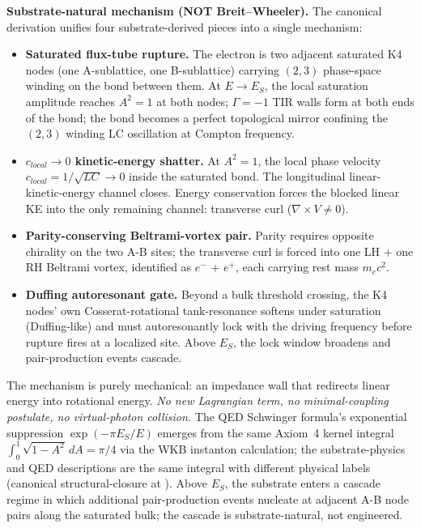 \textbf{Substrate-natural mechanism (NOT Breit--Wheeler).} The canonical derivation unifies four substrate-derived pieces into a single mechanism:

\begin{itemize}
    \item \textbf{Saturated flux-tube rupture.} The electron is two adjacent saturated K4 nodes (one A-sublattice, one B-sublattice) carrying $(2,3)$ phase-space winding on the bond between them. At $E \to E_S$, the local saturation amplitude reaches $A^2 = 1$ at both nodes; $\Gamma = -1$\gammaundeclared{} TIR walls form at both ends of the bond; the bond becomes a perfect topological mirror confining the $(2,3)$ winding LC oscillation at Compton frequency.
    \item \textbf{$c_{local} \to 0$ kinetic-energy shatter.} At $A^2 = 1$, the local phase velocity $c_{local} = 1/\sqrt{LC} \to 0$ inside the saturated bond. The longitudinal linear-kinetic-energy channel closes. Energy conservation forces the blocked linear KE into the only remaining channel: transverse curl ($\nabla \times V \neq 0$).
    \item \textbf{Parity-conserving Beltrami-vortex pair.} Parity requires opposite chirality on the two A-B sites; the transverse curl is forced into one LH + one RH Beltrami vortex, identified as $e^-$ + $e^+$, each carrying rest mass $m_e c^2$.
    \item \textbf{Duffing autoresonant gate.} Beyond a bulk threshold crossing, the K4 nodes' own Cosserat-rotational tank-resonance softens under saturation (Duffing-like) and must autoresonantly lock with the driving frequency before rupture fires at a localized site. Above $E_S$, the lock window broadens and pair-production events cascade.
\end{itemize}

The mechanism is purely mechanical: an impedance wall that redirects linear energy into rotational energy. \emph{No new Lagrangian term, no minimal-coupling postulate, no virtual-photon collision.} The QED Schwinger formula's exponential suppression $\exp(-\pi E_S/E)$ emerges from the same Axiom~4 kernel integral $\int_0^1 \sqrt{1 - A^2}\, dA = \pi/4$ via the WKB instanton calculation; the substrate-physics and QED descriptions are the same integral with different physical labels (canonical structural-closure at ). Above $E_S$, the substrate enters a cascade regime in which additional pair-production events nucleate at adjacent A-B node pairs along the saturated bulk; the cascade is substrate-natural, not engineered.

